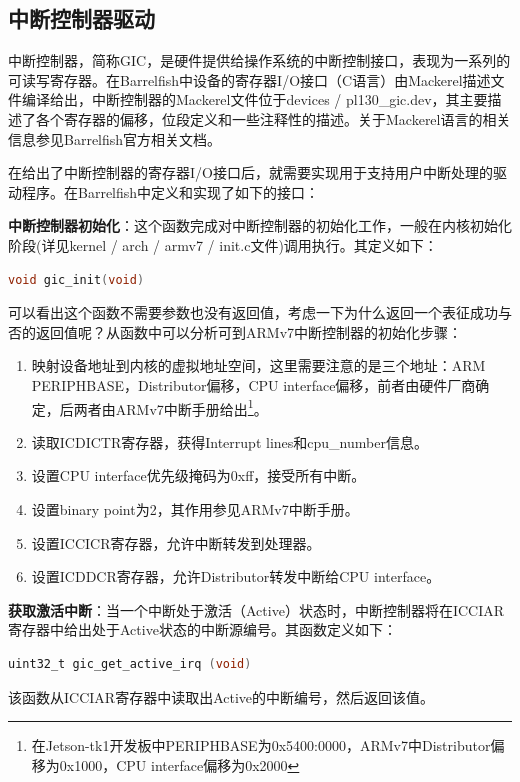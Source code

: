 \documentclass[a4paper, 12pt]{report}
\begin{document}
    \subsection{中断控制器驱动}
    
    中断控制器，简称GIC，是硬件提供给操作系统的中断控制接口，表现为一系列的可读写寄存器。在Barrelfish中设备的寄存器I/O接口（C语言）由Mackerel描述文件编译给出，中断控制器的Mackerel文件位于devices / pl130\_gic.dev，其主要描述了各个寄存器的偏移，位段定义和一些注释性的描述。关于Mackerel语言的相关信息参见Barrelfish官方相关文档。
    
    在给出了中断控制器的寄存器I/O接口后，就需要实现用于支持用户中断处理的驱动程序。在Barrelfish中定义和实现了如下的接口：
    
    \textbf{中断控制器初始化}：这个函数完成对中断控制器的初始化工作，一般在内核初始化阶段(详见kernel / arch / armv7 / init.c文件)调用执行。其定义如下：
    
    \begin{lstlisting}[language=C]
    void gic_init(void)
    \end{lstlisting}
    可以看出这个函数不需要参数也没有返回值，考虑一下为什么返回一个表征成功与否的返回值呢？从函数中可以分析可到ARMv7中断控制器的初始化步骤：
    \begin{enumerate}
        \item 映射设备地址到内核的虚拟地址空间，这里需要注意的是三个地址：ARM PERIPHBASE，Distributor偏移，CPU interface偏移，前者由硬件厂商确定，后两者由ARMv7中断手册给出\footnote{在Jetson-tk1开发板中PERIPHBASE为0x5400:0000，ARMv7中Distributor偏移为0x1000，CPU interface偏移为0x2000}。
        \item 读取ICDICTR寄存器，获得Interrupt lines和cpu\_number信息。
        \item 设置CPU interface优先级掩码为0xff，接受所有中断。
        \item 设置binary point为2，其作用参见ARMv7中断手册。
        \item 设置ICCICR寄存器，允许中断转发到处理器。
        \item 设置ICDDCR寄存器，允许Distributor转发中断给CPU interface。
    \end{enumerate}
    
    \textbf{获取激活中断}：当一个中断处于激活（Active）状态时，中断控制器将在ICCIAR寄存器中给出处于Active状态的中断源编号。其函数定义如下：
    
    \begin{lstlisting}[language=C]
    uint32_t gic_get_active_irq (void)
    \end{lstlisting}
    该函数从ICCIAR寄存器中读取出Active的中断编号，然后返回该值。
    
\end{document}
